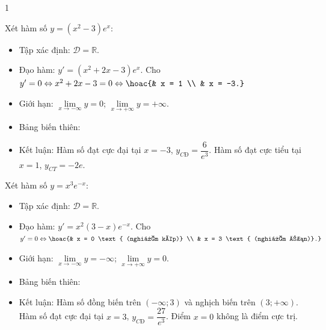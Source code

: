 \begin{vd}
{\begin{enumEX}[a)]{1}
			\item Xét hàm số $y = (x^2 - 3)e^x$:
			\begin{itemize}
				\item Tập xác định: $\mathscr{D} = \mathbb{R}$.
				\item Đạo hàm: $y' = (x^2 + 2x - 3)e^x$. Cho $y' = 0 \Leftrightarrow x^2 + 2x - 3 = 0 \Leftrightarrow \hoac{& x = 1 \\ & x = -3.}$
				\item Giới hạn: $\lim\limits_{x \to -\infty} y = 0$; $\lim\limits_{x \to +\infty} y = +\infty$.
				\item Bảng biến thiên:
				\begin{center}
				\end{center}
				\item Kết luận: Hàm số đạt cực đại tại $x = -3$, $y_{CĐ} = \dfrac{6}{e^3}$. Hàm số đạt cực tiểu tại $x = 1$, $y_{CT} = -2e$.
			\end{itemize}
			\item Xét hàm số $y = x^3 e^{-x}$:
			\begin{itemize}
				\item Tập xác định: $\mathscr{D} = \mathbb{R}$.
				\item Đạo hàm: $y' = x^2(3 - x)e^{-x}$. Cho $y' = 0 \Leftrightarrow \hoac{& x = 0 \text{ (nghiệm kép)} \\ & x = 3 \text{ (nghiệm đơn)}.}$
				\item Giới hạn: $\lim\limits_{x \to -\infty} y = -\infty$; $\lim\limits_{x \to +\infty} y = 0$.
				\item Bảng biến thiên:
				\begin{center}
				\end{center}
				\item Kết luận: Hàm số đồng biến trên $(-\infty; 3)$ và nghịch biến trên $(3; +\infty)$. Hàm số đạt cực đại tại $x = 3$, $y_{CĐ} = \dfrac{27}{e^3}$. Điểm $x=0$ không là điểm cực trị.

\end{itemize}
\end{enumEX}}
\end{vd}
